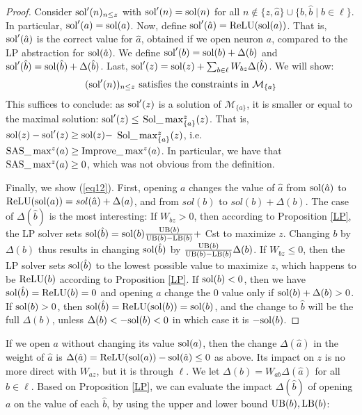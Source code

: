 	
	\begin{proof}
    Consider $\mathrm{sol}'(n)_{n \leq z}$ with
	$\mathrm{sol}'(n)=\mathrm{sol}(n)$ for all $n \notin \{z,\hat{a}\} \cup \{b,\hat{b} \mid b \in \ell\}$. In particular,  $\mathrm{sol}'(a) = \mathrm{sol}(a)$.
	Now, define $\mathrm{sol}'(\hat{a}) = \mathrm{ReLU}(\mathrm{sol}(a))$. 
	That is, $\mathrm{sol}'(\hat{a})$ is the correct value for $\hat{a}$, obtained if we open neuron $a$, compared to the LP abstraction for $\mathrm{sol}(\hat{a})$.
	We define $\mathrm{sol}'(b)=\mathrm{sol}(b)+\Delta(b)$ and 
	$\mathrm{sol}'(\hat{b})=\mathrm{sol}(\hat{b}) + \Delta(\hat{b})$.
	Last, $\mathrm{sol}'(z)=\mathrm{sol}(z) + \sum_{b \in \ell} W_{bz} \Delta(\hat{b})$.
	We will show:
	\begin{equation}
		\label{eq12}
		(\mathrm{sol}'(n))_{n \leq z} \text{ satisfies the constraints in } \mathcal{M}_{\{a\}}
	\end{equation} 
	This suffices to conclude: as
	$\mathrm{sol}'(z)$ is a solution of $\mathcal{M}_{\{a\}}$, it is smaller or equal to the maximal solution: $\mathrm{sol}'(z) \leq$ $\mathrm{Sol}\_\max_{\{a\}}^z(z)$. That is, 
	$\mathrm{sol}(z)-\mathrm{sol}'(z) \geq \mathrm{sol}(z) -$ $\mathrm{Sol}\_\max_{\{a\}}^z(z)$, i.e. 
	$ \mathrm{SAS}\_\max^z(a) \geq \mathrm{Improve}\_\max^z(a)$.
	In particular, we have that $\mathrm{SAS}\_\max^z(a) \geq 0$, which was not obvious from the definition.


	

	Finally, we show (\ref{eq12}). First, opening $a$ changes the value of $\hat{a}$ from
	$\mathrm{sol}(\hat{a})$ to $\mathrm{ReLU}(\mathrm{sol}(a)) = sol(\hat{a}) + \Delta(a)$, 
	and from $sol(b)$ to $sol(b) + \Delta(b)$.
	The case of $\Delta(\hat{b})$ is the most interesting:
	If $W_{bz}>0$, then according to Proposition \ref{LP}, the LP solver
sets $\mathrm{sol}(\hat{b}) = \mathrm{sol}(b) \frac{\mathrm{UB}(b)}{\mathrm{UB}(b)-\mathrm{LB}(b)} +$ Cst to maximize $z$.
Changing $b$ by $\Delta(b)$ thus results in changing $\mathrm{sol}(\hat{b})$ by 
$\frac{\mathrm{UB}(b)}{\mathrm{UB}(b)-\mathrm{LB}(b)}\Delta(b)$.
If $W_{bz}\leq0$, then the LP solver sets $\mathrm{sol}(\hat{b})$ to the lowest possible value to maximize $z$, which happens to be $\mathrm{ReLU}(b)$ according to Proposition \ref{LP}.
If $\mathrm{sol}(b) < 0$, then we have $\mathrm{sol}(\hat{b})=\mathrm{ReLU}(b)=0$ and opening $a$ change the 0 value only if $\mathrm{sol}(b)+\Delta(b)>0$. If $\mathrm{sol}(b) > 0$, then 
$\mathrm{sol}(\hat{b})=\mathrm{ReLU}(\mathrm{sol}(b))=\mathrm{sol}(b)$, and the change to $\hat{b}$ will be 
the full $\Delta(b)$, unless $\Delta(b) < -\mathrm{sol}(b) < 0$ in which case it is 
$-\mathrm{sol}(b)$.
		\end{proof}


	\iffalse

	If we open $a$ without changing its value $\mathrm{sol}(a)$, then the change $\Delta(\hat{a})$ in the weight of $\hat{a}$ is 
$\Delta(\hat{a})=\mathrm{ReLU}(\mathrm{sol}(a)) - \mathrm{sol}(\hat{a}) \leq 0$ as above. Its impact on $z$ is no more direct with $W_{az}$, but it is through $\ell$. 
We let $\Delta(b) = W_{ab}\Delta(\hat{a})$ for all $b \in \ell$.
Based on Proposition \ref{LP}, we can evaluate the impact 
$\Delta(\hat{b})$ of opening $a$ on the value of each $\hat{b}$, by using the upper and lower bound $\mathrm{UB}(b),\mathrm{LB}(b)$:

